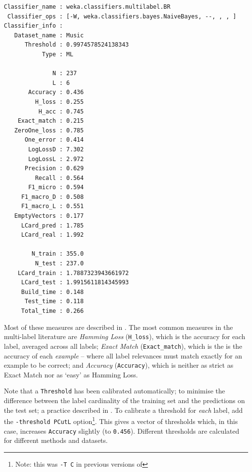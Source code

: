 \documentclass[11pt]{article}
\newcommand{\MEKA}{Meka}
\begin{document}
{\small
\begin{verbatim}
Classifier_name : weka.classifiers.multilabel.BR
 Classifier_ops : [-W, weka.classifiers.bayes.NaiveBayes, --, , , ]
Classifier_info : 
   Dataset_name : Music
      Threshold : 0.9974578524138343
           Type : ML

              N : 237
              L : 6    
       Accuracy : 0.436
         H_loss : 0.255
          H_acc : 0.745
    Exact_match : 0.215
   ZeroOne_loss : 0.785
      One_error : 0.414
       LogLossD : 7.302
       LogLossL : 2.972
      Precision : 0.629
         Recall : 0.564
       F1_micro : 0.594
     F1_macro_D : 0.508
     F1_macro_L : 0.551
   EmptyVectors : 0.177
     LCard_pred : 1.785
     LCard_real : 1.992

        N_train : 355.0
         N_test : 237.0
    LCard_train : 1.7887323943661972
     LCard_test : 1.9915611814345993
     Build_time : 0.148
      Test_time : 0.118
     Total_time : 0.266

\end{verbatim}
}

Most of these measures are described in \cite{Thesis,ECC2,MMD}. The most common measures in the multi-label literature are \textit{Hamming Loss} (\texttt{H\_loss}), which is the accuracy for each label, averaged across all labels; \textit{Exact Match} (\texttt{Exact\_match}), which is the is the accuracy of each \emph{example} -- where all label relevances must match exactly for an example to be correct; and \textit{Accuracy} (\texttt{Accuracy}), which is neither as strict as Exact Match nor as `easy' as Hamming Loss.


Note that a \texttt{Threshold} has been calibrated automatically; to minimise the difference between the label cardinality of the training set and the predictions on the test set; a practice described in \cite{ECC2}. To calibrate a threshold for \emph{each} label, add the \texttt{-threshold PCutL} option\footnote{Note: this was \texttt{-T C} in previous versions of \framework{\MEKA}}. This gives a vector of thresholds which, in this case, increases \texttt{Accuracy} slightly (to \texttt{0.456}). Different thresholds are calculated for different methods and datasets.

\end{document}
